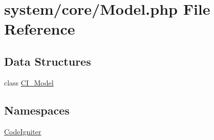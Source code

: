 \hypertarget{_model_8php}{}\section{system/core/\+Model.php File Reference}
\label{_model_8php}
\subsection*{Data Structures}
\begin{DoxyCompactItemize}
\item 
class \mbox{\hyperlink{class_c_i___model}{C\+I\+\_\+\+Model}}
\end{DoxyCompactItemize}
\subsection*{Namespaces}
\begin{DoxyCompactItemize}
\item 
 \mbox{\hyperlink{namespace_code_igniter}{Code\+Igniter}}
\end{DoxyCompactItemize}
